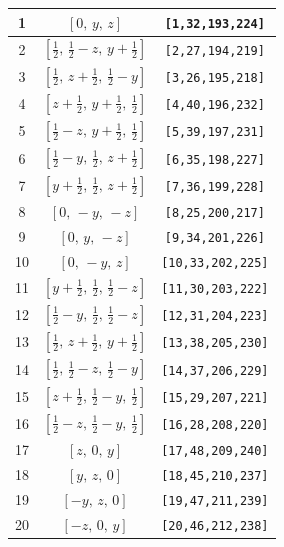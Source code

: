 \documentclass[fleqn,8pt]{jsarticle}
\begin{document}
\begin{longtable}{ccc}
1 & $\left[ 0,\, y,\, z \right]$ & {\tt [1,32,193,224]} \\ \hline
2 & $\left[ \frac{1}{2},\, \frac{1}{2} - z,\, y + \frac{1}{2} \right]$ & {\tt [2,27,194,219]} \\ \hline
3 & $\left[ \frac{1}{2},\, z + \frac{1}{2},\, \frac{1}{2} - y \right]$ & {\tt [3,26,195,218]} \\ \hline
4 & $\left[ z + \frac{1}{2},\, y + \frac{1}{2},\, \frac{1}{2} \right]$ & {\tt [4,40,196,232]} \\ \hline
5 & $\left[ \frac{1}{2} - z,\, y + \frac{1}{2},\, \frac{1}{2} \right]$ & {\tt [5,39,197,231]} \\ \hline
6 & $\left[ \frac{1}{2} - y,\, \frac{1}{2},\, z + \frac{1}{2} \right]$ & {\tt [6,35,198,227]} \\ \hline
7 & $\left[ y + \frac{1}{2},\, \frac{1}{2},\, z + \frac{1}{2} \right]$ & {\tt [7,36,199,228]} \\ \hline
8 & $\left[ 0,\, - y,\, - z \right]$ & {\tt [8,25,200,217]} \\ \hline
9 & $\left[ 0,\, y,\, - z \right]$ & {\tt [9,34,201,226]} \\ \hline
10 & $\left[ 0,\, - y,\, z \right]$ & {\tt [10,33,202,225]} \\ \hline
11 & $\left[ y + \frac{1}{2},\, \frac{1}{2},\, \frac{1}{2} - z \right]$ & {\tt [11,30,203,222]} \\ \hline
12 & $\left[ \frac{1}{2} - y,\, \frac{1}{2},\, \frac{1}{2} - z \right]$ & {\tt [12,31,204,223]} \\ \hline
13 & $\left[ \frac{1}{2},\, z + \frac{1}{2},\, y + \frac{1}{2} \right]$ & {\tt [13,38,205,230]} \\ \hline
14 & $\left[ \frac{1}{2},\, \frac{1}{2} - z,\, \frac{1}{2} - y \right]$ & {\tt [14,37,206,229]} \\ \hline
15 & $\left[ z + \frac{1}{2},\, \frac{1}{2} - y,\, \frac{1}{2} \right]$ & {\tt [15,29,207,221]} \\ \hline
16 & $\left[ \frac{1}{2} - z,\, \frac{1}{2} - y,\, \frac{1}{2} \right]$ & {\tt [16,28,208,220]} \\ \hline
17 & $\left[ z,\, 0,\, y \right]$ & {\tt [17,48,209,240]} \\ \hline
18 & $\left[ y,\, z,\, 0 \right]$ & {\tt [18,45,210,237]} \\ \hline
19 & $\left[ - y,\, z,\, 0 \right]$ & {\tt [19,47,211,239]} \\ \hline
20 & $\left[ - z,\, 0,\, y \right]$ & {\tt [20,46,212,238]} \\ \hline

\end{longtable}
\end{document}
